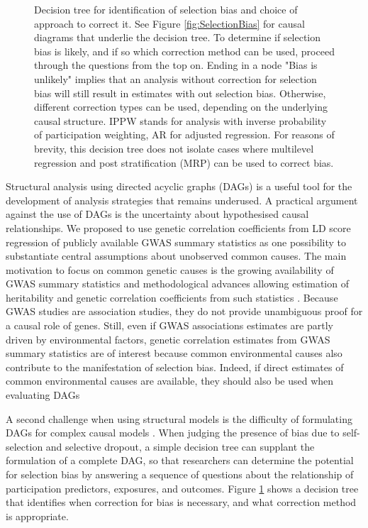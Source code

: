 \documentclass[12pt]{article}
\begin{document}
\begin{figure}
	\centering
	\begin{singlespace}
    \end{singlespace}
	
	\caption{Decision tree for identification of selection bias and choice of approach to correct it. See Figure \ref{fig:SelectionBias} for causal diagrams that underlie the decision tree. 
	To determine if selection bias is likely, and if so which correction method can be used, proceed through the questions from the top on. Ending in a node "Bias is unlikely" implies that an  analysis without correction for selection bias will still result in estimates with out selection bias. Otherwise, different correction types can be used, depending on the underlying causal structure. IPPW stands for analysis with inverse probability of participation weighting, AR for adjusted regression. For reasons of brevity, this decision tree does not isolate cases where multilevel regression and post stratification (MRP) can be used to correct bias. }
	\label{fig:DecisionTree}
\end{figure}


Structural analysis using directed acyclic graphs (DAGs) is a useful tool for the development of analysis strategies that remains underused. A practical argument against the use of DAGs is the uncertainty about hypothesised causal relationships. We proposed to use genetic correlation coefficients from LD score regression of publicly available GWAS summary statistics as one possibility to substantiate central assumptions about unobserved common causes. The main motivation to focus on common genetic causes is the growing availability of GWAS summary statistics and methodological advances allowing estimation of heritability and genetic correlation coefficients from such statistics \cite{Bulik-Sullivan2015-er, Bulik-Sullivan2015-xn}. Because GWAS studies are association studies, they do not provide unambiguous proof for a causal role of genes. Still, even if GWAS associations estimates are partly driven by environmental factors, genetic correlation estimates from GWAS summary statistics are of interest because common environmental causes also contribute to the manifestation of selection bias. Indeed, if direct estimates of common environmental causes are available, they should also be used when evaluating DAGs

A second challenge when using structural models is the difficulty of formulating DAGs for complex causal models \cite{Shrier2008-vr}. When judging the presence of bias due to self-selection and selective dropout, a simple decision tree can supplant the formulation of a complete DAG, so that researchers can determine the potential for selection bias by answering a sequence of questions about the relationship of participation predictors, exposures, and outcomes. Figure \ref{fig:DecisionTree} shows a decision tree that identifies when correction for bias is necessary, and what correction method is appropriate.
\end{document}
